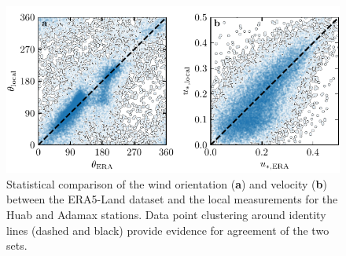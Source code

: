 \begin{figure}[p]
\centering
\includegraphics[scale=1]{Figures/Figure6_supp.pdf}
\caption{Statistical comparison of the wind orientation (\textbf{a}) and velocity (\textbf{b}) between the ERA5-Land dataset and the local measurements for the Huab and Adamax stations. Data point clustering around identity lines (dashed and black) provide evidence for agreement of the two sets.}
\label{Fig6_supp}
\end{figure}

